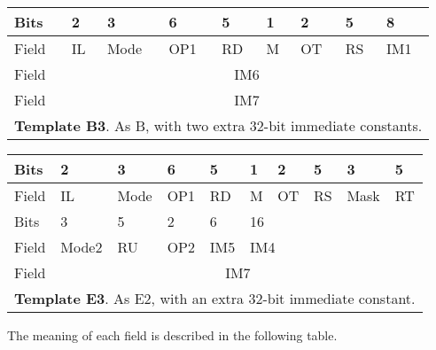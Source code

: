 \documentclass[forwardcom.tex]{subfiles}
\begin{document}
\begin{table}[h!] \label{table:templateB3}
\vv
\begin{tabular}{|p{10mm}|p{10mm}|p{10mm}|p{10mm}|p{10mm}|p{10mm}|p{10mm}|p{10mm}|p{24mm}|} \hline
 Bits & 2 & 3 & 6 & 5 & 1 & 2 & 5 & 8 \\ \hline
Field & IL & Mode & OP1 & RD & M & OT & RS & IM1 \\ \hline
Field & \multicolumn{8}{|c|}{ IM6 } \\ \hline
Field & \multicolumn{8}{|c|}{ IM7 } \\ \hline
\multicolumn{9}{|l|}{
\textbf{Template B3}. As B, with two extra 32-bit immediate constants.
} \\ \hline
\end{tabular}
\end{table}
\vspace{4mm}

\begin{table}[h!] \label{table:templateE3}
\vv
\begin{tabular}{|p{10mm}|p{10mm}|p{10mm}|p{10mm}|p{10mm}|p{10mm}|p{10mm}|p{10mm}|p{10mm}|p{10mm}|} \hline
Bits & 2 & 3 & 6 & 5 & 1 & 2 & 5 & 3 & 5 \\ \hline
Field & IL & Mode & OP1 & RD & M & OT & RS & Mask & RT  \\ \hline
Bits & 3 & 5 & 2 & 6 & \multicolumn{5}{l|}{ \hspace{29mm} 16  } \\ \hline
Field  & Mode2 & RU & OP2 & IM5 & \multicolumn{5}{l|}{ \hspace{28mm} IM4 } \\ \hline
Field & \multicolumn{9}{|c|}{ IM7 } \\ \hline
\multicolumn{10}{|l|}{
\textbf{Template E3}. As E2, with an extra 32-bit immediate constant.
} \\ \hline
\end{tabular}
\end{table}
\vspace{4mm}

The meaning of each field is described in the following table.

\pagebreak
\end{document}

